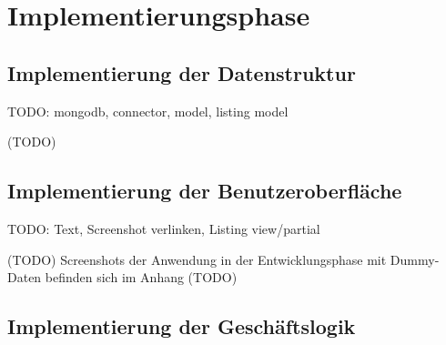 \section{Implementierungsphase} 
\label{sec:Implementierungsphase}

\subsection{Implementierung der Datenstruktur}
\label{subsec:ImplementierungDatenstruktur}

TODO: mongodb, connector, model, listing model

(TODO)

\subsection{Implementierung der Benutzeroberfläche}
\label{subsec:ImplementierungBenutzeroberfläche}

TODO: Text, Screenshot verlinken, Listing view/partial

(TODO) Screenshots der Anwendung in der Entwicklungsphase mit Dummy-Daten befinden sich im Anhang (TODO)

\subsection{Implementierung der Geschäftslogik}
\label{subsec:ImplementierungGeschäftslogik}

